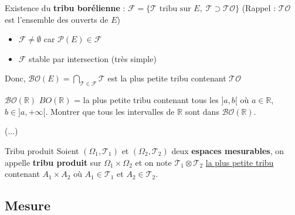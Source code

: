 \begin{myproof}{}{} Existence du \textbf{tribu borélienne} : 
  $\mathcal{F}= \{ \mathcal{T} \text{ tribu sur } E, \; \mathcal{T} \supset \mathcal{TO}\}$ (Rappel : $\mathcal{TO}$ est l'ensemble des ouverts de $E$)
  \begin{itemize}

      \item $\mathcal{F} \ne \emptyset$ car $\mathscr{P}(E) \in \mathcal{F}$ 
      \item $\mathcal{F}$ stable par intersection (très simple)

  \end{itemize}
  Donc, $\mathcal{BO}(E) = \bigcap _{\mathcal{T} \in \mathcal{F}} \mathcal{T}$ est la plus petite tribu contenant $\mathcal{TO}$
\end{myproof}


\begin{Example}{$\mathcal{BO}(\mathbb{R})$}{}
  $BO(\mathbb{R})$ = la plus petite tribu contenant tous les $]a,b[$ où $a \in \mathbb{R}$, $b \in ]a, + \infty[$. Montrer que tous les intervalles de $\mathbb{R}$ sont dans $\mathcal{BO}(\mathbb{R})$.
\end{Example}


(...)



\begin{Prop}{Tribu produit}{}
Soient $(\Omega_1, \mathcal{T}_1)$ et $(\Omega_2, \mathcal{T}_2)$ deux \textbf{espaces mesurables}, on appelle \textbf{tribu produit} sur $\Omega_1 \times \Omega_2$ et on note $\mathcal{T}_1 \otimes \mathcal{T}_2$ \underline{la plus petite tribu} contenant $A_1 \times A_2$ où $A_1 \in \mathcal{T}_1$ et $A_2 \in \mathcal{T}_2$.
\end{Prop}

\subsection{Mesure} %
\label{sub:Mesure}


